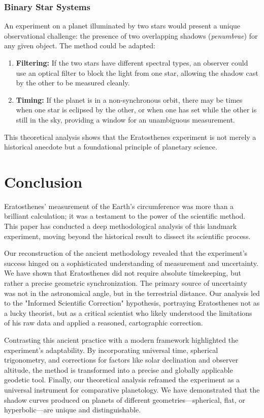 \documentclass[11pt]{article}
\begin{document}
\subsubsection{Binary Star Systems}
An experiment on a planet illuminated by two stars would present a unique observational challenge: the presence of two overlapping shadows (\textit{penumbrae}) for any given object. The method could be adapted:
\begin{enumerate}
    \item \textbf{Filtering:} If the two stars have different spectral types, an observer could use an optical filter to block the light from one star, allowing the shadow cast by the other to be measured cleanly.
    \item \textbf{Timing:} If the planet is in a non-synchronous orbit, there may be times when one star is eclipsed by the other, or when one has set while the other is still in the sky, providing a window for an unambiguous measurement.
\end{enumerate}
This theoretical analysis shows that the Eratosthenes experiment is not merely a historical anecdote but a foundational principle of planetary science.

\section{Conclusion}

Eratosthenes' measurement of the Earth's circumference was more than a brilliant calculation; it was a testament to the power of the scientific method. This paper has conducted a deep methodological analysis of this landmark experiment, moving beyond the historical result to dissect its scientific process.

Our reconstruction of the ancient methodology revealed that the experiment's success hinged on a sophisticated understanding of measurement and uncertainty. We have shown that Eratosthenes did not require absolute timekeeping, but rather a precise geometric synchronization. The primary source of uncertainty was not in the astronomical angle, but in the terrestrial distance. Our analysis led to the "Informed Scientific Correction" hypothesis, portraying Eratosthenes not as a lucky theorist, but as a critical scientist who likely understood the limitations of his raw data and applied a reasoned, cartographic correction.

Contrasting this ancient practice with a modern framework highlighted the experiment's adaptability. By incorporating universal time, spherical trigonometry, and corrections for factors like solar declination and observer altitude, the method is transformed into a precise and globally applicable geodetic tool. Finally, our theoretical analysis reframed the experiment as a universal instrument for comparative planetology. We have demonstrated that the shadow curves produced on planets of different geometries—spherical, flat, or hyperbolic—are unique and distinguishable.
\end{document}
